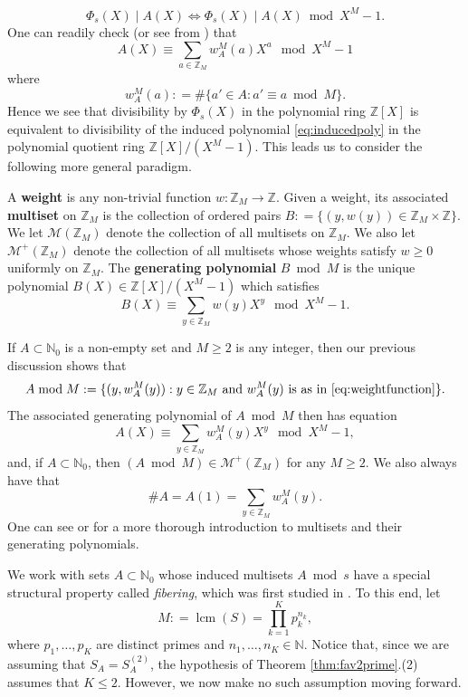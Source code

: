 \documentclass[12pt]{amsart}
\numberwithin{equation}{section}
\DeclareMathOperator{\lcm}{lcm}
\begin{document}
$$
\Phi_s (X) \mid A (X)
\Leftrightarrow
\Phi_s (X)\mid A(X)\bmod X^{M} - 1.
$$
One can readily check (or see from \cite[Section 2]{KLMS}) that
\begin{equation}\label{eq:inducedpoly}
A(X) \equiv \sum\limits_{a \in \mathbb{Z}_M} w_A^M (a) X^a \mod X^M - 1
\end{equation}
where
\begin{equation}\label{eq:weightfunction}
w_A^M (a) : = \# \{a' \in A : a' \equiv a \bmod M \}.
\end{equation}
Hence we see that divisibility by $\Phi_s (X)$ in the polynomial ring $\mathbb{Z}[X]$ is equivalent to divisibility of the induced polynomial \eqref{eq:inducedpoly} in the polynomial quotient ring $\mathbb{Z}[X]/(X^M-1)$. This leads us to consider the following more general paradigm.

\begin{definition}
A \textbf{weight} is any non-trivial function $w : \mathbb{Z}_M \rightarrow \mathbb{Z}$. Given a weight, its associated \textbf{multiset} on $\mathbb{Z}_M$ is the collection of ordered pairs
$
B : = \{(y,w (y)) \in \mathbb{Z}_M \times \mathbb{Z}\}.
$
We let $\mathcal{M} (\mathbb{Z}_M)$ denote the collection of all multisets on $\mathbb{Z}_M$. We also let $\mathcal{M}^+ (\mathbb{Z}_M)$ denote the collection of all multisets whose weights satisfy $w \geq 0$ uniformly on $\mathbb{Z}_M$. The \textbf{generating polynomial} $B \bmod M$ is the unique polynomial $B(X) \in \mathbb{Z}[X]/(X^M-1)$ which satisfies
$$
B(X) \equiv \sum\limits_{y \in \mathbb{Z}_M} w(y) X^y \mod X^M - 1.
$$
\end{definition}

If $A \subset \mathbb{N}_{0}$ is a non-empty set and $M \geq 2$ is any integer, then our previous discussion shows that
$$
A \bmod M : = \{(y, w_A^M (y)) : y \in \mathbb{Z}_M \textrm{ and } w_A^M (y) \textrm{ is as in } \eqref{eq:weightfunction}\}.
$$
The associated generating polynomial of $A \bmod M$ then has equation
$$
A (X) \equiv \sum\limits_{y \in \mathbb{Z}_M} w_A^M (y) X^y \mod X^M - 1,
$$
and, if $A \subset \mathbb{N}_0$, then $(A \bmod M) \in \mathcal{M}^+ (\mathbb{Z}_M)$ for any $M \geq 2$. We also always have that
$$
\# A = A(1) = \sum\limits_{y \in \mathbb{Z}_M} w_A^M (y).
$$
One can see \cite[Section 4]{LM} or \cite[Section 2]{KLMS} for a more thorough introduction to multisets and their generating polynomials.

We work with sets $A \subset \mathbb{N}_0$ whose induced multisets $A \bmod s$ have a special structural property called \textit{fibering}, which was first studied in \cite{KLMS}. To this end, let 
$$
M : =\lcm (S) = \prod_{k=1}^{K} p_k^{n_k},
$$
where $p_1,\dots, p_K$ are distinct primes and $n_1,\dots,n_K \in\mathbb{N}$. Notice that, since we are assuming that $S_A = S_A^{(2)}$, the hypothesis of Theorem \ref{thm:fav2prime}.(2) assumes that $K \leq 2$. However, we now make no such assumption moving forward. 
\end{document}

